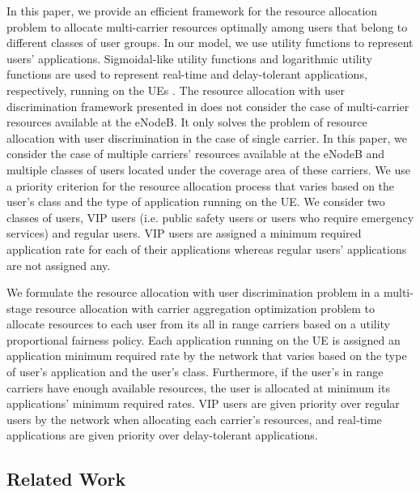 \documentclass[journal]{IEEEtran} 				\IEEEoverridecommandlockouts 						\usepackage{amsmath,amssymb}
\begin{document}
In this paper, we provide an efficient framework for the resource allocation problem to allocate multi-carrier resources optimally among users that belong to different classes of user groups. In our model, we use utility functions to represent users' applications. Sigmoidal-like utility functions and logarithmic utility functions are used to represent real-time and delay-tolerant applications, respectively, running on the UEs \cite{Ahmed_Utility1}.
The resource allocation with user discrimination framework presented in \cite{Haya_Utility4} does not consider the case of multi-carrier resources available at the eNodeB. It only solves the problem of resource allocation with user discrimination in the case of single carrier. In this paper, we consider the case of multiple carriers' resources available at the eNodeB and multiple classes of users located under the coverage area of these carriers. We use a priority criterion for the resource allocation process that varies based on the user's class and the type of application running on the UE. We consider two classes of users, VIP users (i.e. public safety users or users who require emergency services) and regular users. VIP users are assigned a minimum required application rate for each of their applications whereas regular users' applications are not assigned any.

We formulate the resource allocation with user discrimination problem in a multi-stage resource allocation with carrier aggregation optimization problem to allocate resources to each user from its all in range carriers based on a utility proportional fairness policy. Each application running on the UE is assigned an application minimum required rate by the network that varies based on the type of user's application and the user's class. Furthermore, if the user's in range carriers have enough available resources, the user is allocated at minimum its applications' minimum required rates. VIP users are given priority over regular users by the network when allocating each carrier's resources, and real-time applications are given priority over delay-tolerant applications.
\subsection{Related Work}\label{sec:related}
\end{document}
